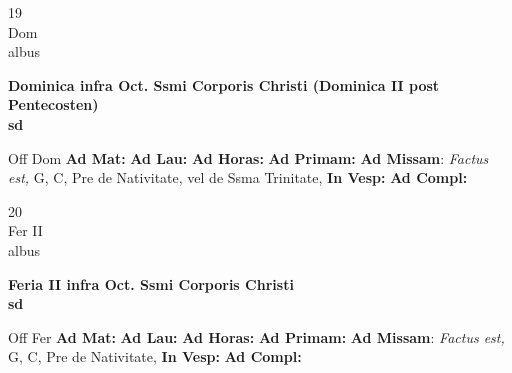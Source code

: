 \documentclass[10pt, openany]{book}
\begin{document}
    \begin{center}
        \begin{minipage}{3.5in}
            \vspace{2em}
            \begin{minipage}{0.5in}
                {\Huge 19} \\
                {\normalsize Dom} \\
                {\normalsize albus}
            \end{minipage}
            \begin{minipage}{3.0in}
                \textbf{ \large Dominica infra Oct. Ssmi Corporis Christi (Dominica II post Pentecosten) \\
                \textnormal{\normalsize sd}} \\ 
            \end{minipage}
            \begin{justify}Off Dom
                \textbf{Ad Mat: }
                \textbf{Ad Lau: }
                \textbf{Ad Horas: }
                \textbf{Ad Primam: }\textbf{Ad Missam}: \textit{Factus est,} G, C, Pre de Nativitate, vel de Ssma Trinitate,  
                \textbf{In Vesp: }
                \textbf{Ad Compl: }
            \end{justify}
        \end{minipage}
    \end{center}

    \begin{center}
        \begin{minipage}{3.5in}
            \vspace{2em}
            \begin{minipage}{0.5in}
                {\Huge 20} \\
                {\normalsize Fer II} \\
                {\normalsize albus}
            \end{minipage}
            \begin{minipage}{3.0in}
                \textbf{ \large Feria II infra Oct. Ssmi Corporis Christi \\
                \textnormal{\normalsize sd}} \\ 
            \end{minipage}
            \begin{justify}Off Fer
                \textbf{Ad Mat: }
                \textbf{Ad Lau: }
                \textbf{Ad Horas: }
                \textbf{Ad Primam: }\textbf{Ad Missam}: \textit{Factus est,} G, C, Pre de Nativitate,  
                \textbf{In Vesp: }
                \textbf{Ad Compl: }
            \end{justify}
        \end{minipage}
    \end{center}
\end{document}

